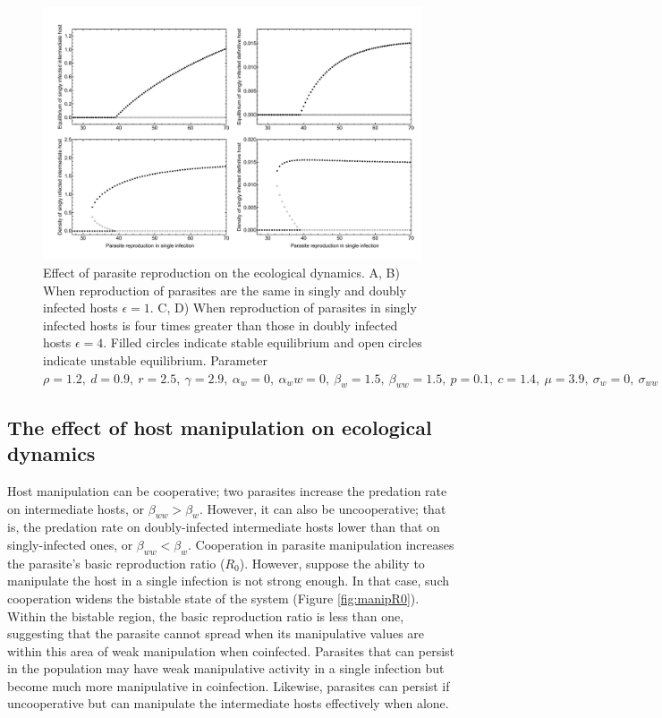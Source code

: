 \documentclass[11pt]{article}
\begin{document}
\begin{figure}[!ht]
\includegraphics[width = \textwidth]{Figures/bistability.pdf}
\caption{Effect of parasite reproduction on the ecological dynamics. A, B) When reproduction of parasites are the same in singly and doubly infected hosts $\epsilon = 1$. C, D)  When reproduction of parasites in singly infected hosts is four times greater than those in doubly infected hosts $\epsilon = 4$. Filled circles indicate stable equilibrium and open circles indicate unstable equilibrium. Parameter $\rho = 1.2, \  d = 0.9, \  r = 2.5, \ \gamma = 2.9, \ \alpha_w = 0, \ \alpha_ww =  0, \ \beta_w = 1.5, \ \beta_{ww} = 1.5, \ p = 0.1, \  c = 1.4, \ \mu = 3.9,  \ \sigma_w = 0, \ \sigma_{ww} = 0, \  q = 0.01, \ \delta = 0.9, \ k = 0.26$
}
\label{fig:bistability}
\end{figure}

\subsection*{The effect of host manipulation on ecological dynamics}

Host manipulation can be cooperative; two parasites increase the predation rate on intermediate hosts, or $\beta_{ww} > \beta_w$. 
However, it can also be uncooperative; that is, the predation rate on doubly-infected intermediate hosts lower than that on singly-infected ones, or $\beta_{ww} < \beta_w$.
Cooperation in parasite manipulation increases the parasite's basic reproduction ratio ($R_0$). 
However, suppose the ability to manipulate the host in a single infection is not strong enough. 
In that case, such cooperation widens the bistable state of the system (Figure \ref{fig:manipR0}). 
Within the bistable region, the basic reproduction ratio is less than one, suggesting that the parasite cannot spread when its manipulative values are within this area of weak manipulation when coinfected. 
Parasites that can persist in the population may have weak manipulative activity in a single infection but become much more manipulative in coinfection. 
Likewise, parasites can persist if uncooperative but can manipulate the intermediate hosts effectively when alone.
\end{document}
